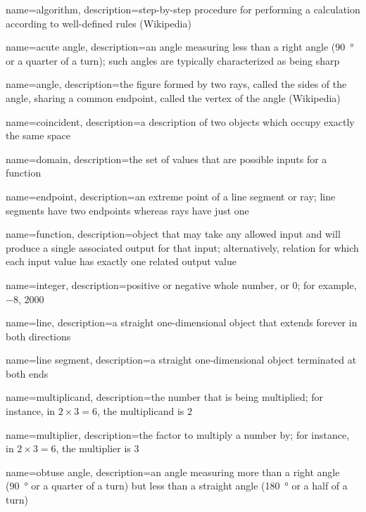 {
  name=algorithm,
  description={step-by-step procedure for performing a calculation
  according to well-defined rules (Wikipedia)}
}

{
  name=acute angle,
  description={an angle measuring less than a right angle (\SI{90}{\degree} or a
  quarter of a turn); such angles are typically characterized as being sharp}
}

{
  name=angle,
  description={the figure formed by two rays, called the sides of the angle,
  sharing a common endpoint, called the vertex of the angle (Wikipedia)}
}

{
  name=coincident,
  description={a description of two objects which occupy exactly the same space}
}

{
  name=domain,
  description={the set of values that are possible inputs for a function}
}

{
  name=endpoint,
  description={an extreme point of a line segment or ray; line segments have two
  endpoints whereas rays have just one}
}

{
  name=function,
  description={object that may take any allowed input and will produce a
  single associated output for that input; alternatively, relation for
  which each input value has exactly one related output value}
}

{
  name=integer,
  description={positive or negative whole number, or $0$; for example,
  $-8$, $2000$}
}

{
  name=line,
  description={a straight one-dimensional object that extends forever in both
  directions}
}

{
  name=line segment,
  description={a straight one-dimensional object terminated at both ends}
}

{
  name=multiplicand,
  description={the number that is being multiplied; for instance, in
  $2\times3=6$, the multiplicand is $2$}
}

{
  name=multiplier,
  description={the factor to multiply a number by; for instance, in
  $2\times3=6$, the multiplier is $3$}
}

{
  name=obtuse angle,
  description={an angle measuring more than a right angle (\SI{90}{\degree} or a
  quarter of a turn) but less than a straight angle (\SI{180}{\degree} or a half
  of a turn)}
}

